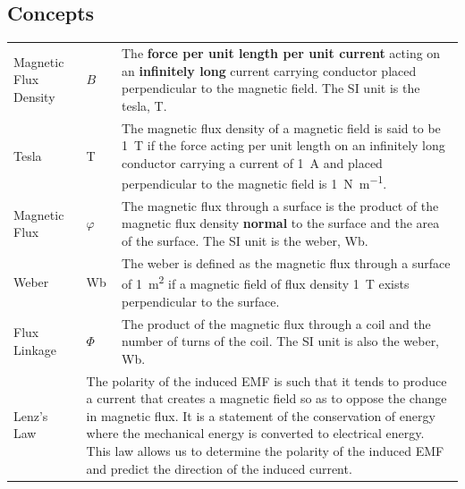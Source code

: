 \documentclass[a4paper,11pt]{article}
\begin{document}
	\subsection{Concepts}
	\begin{center}
		\renewcommand{\arraystretch}{1.2}
		\begin{tabular}{@{} l l p{10cm} @{}}
			\toprule
			Magnetic Flux Density & $B$ & The \textbf{force per unit length per unit current} acting on an \textbf{infinitely long} current carrying conductor placed perpendicular to the magnetic field. The SI unit is the tesla, \si{\tesla}. \\
			Tesla & \si{\tesla} & The magnetic flux density of a magnetic field is said to be \SI{1}{\tesla} if the force acting per unit length on an infinitely long conductor carrying a current of \SI{1}{\ampere} and placed perpendicular to the magnetic field is \SI{1}{\newton\per\meter}. \\
			Magnetic Flux & $\varphi$ & The magnetic flux through a surface is the product of the magnetic flux density \textbf{normal} to the surface and the area of the surface. The SI unit is the weber, \si{\weber}. \\
			Weber & \si{\weber} & The weber is defined as the magnetic flux through a surface of \SI{1}{\meter\squared} if a magnetic field of flux density \SI{1}{\tesla} exists perpendicular to the surface.\\
			Flux Linkage & $\Phi$ & The product of the magnetic flux through a coil and the number of turns of the coil. The SI unit is also the weber, \si{\weber}. \\
			\midrule
			Lenz's Law & \multicolumn{2}{p{11.1cm}}{The polarity of the induced EMF is such that it tends to produce a current that creates a magnetic field so as to oppose the change in magnetic flux. It is a statement of the conservation of energy where the mechanical energy is converted to electrical energy. This law allows us to determine the polarity of the induced EMF and predict the direction of the induced current.} \\
			\bottomrule
		\end{tabular}
	\end{center}
\end{document}
